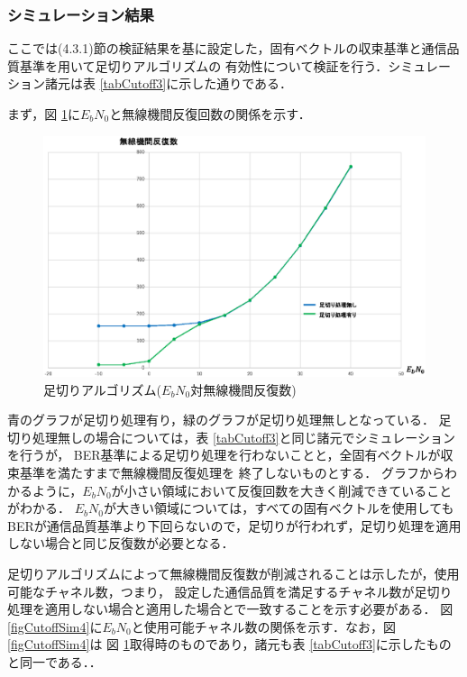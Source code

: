 \subsubsection{シミュレーション結果}
ここでは(4.3.1)節の検証結果を基に設定した，固有ベクトルの収束基準と通信品質基準を用いて足切りアルゴリズムの
有効性について検証を行う．シミュレーション諸元は表 \ref{tabCutoff3}に示した通りである．

まず，図 \ref{figCutoffSim3}に$E_bN_0$と無線機間反復回数の関係を示す．

\begin{figure}[h]
    \centering
    \includegraphics[width=0.95\linewidth]{chapter4/figure/CutoffSim3.eps}
    \caption{足切りアルゴリズム($E_bN_0$対無線機間反復数)}
    \label{figCutoffSim3}
\end{figure}

青のグラフが足切り処理有り，緑のグラフが足切り処理無しとなっている．
足切り処理無しの場合については，表 \ref{tabCutoff3}と同じ諸元でシミュレーションを行うが，
BER基準による足切り処理を行わないことと，全固有ベクトルが収束基準を満たすまで無線機間反復処理を
終了しないものとする．
グラフからわかるように，$E_bN_0$が小さい領域において反復回数を大きく削減できていることがわかる．
$E_bN_0$が大きい領域については，すべての固有ベクトルを使用しても
BERが通信品質基準より下回らないので，足切りが行われず，足切り処理を適用しない場合と同じ反復数が必要となる．

足切りアルゴリズムによって無線機間反復数が削減されることは示したが，使用可能なチャネル数，つまり，
設定した通信品質を満足するチャネル数が足切り処理を適用しない場合と適用した場合とで一致することを示す必要がある．
図 \ref{figCutoffSim4}に$E_bN_0$と使用可能チャネル数の関係を示す．なお，図 \ref{figCutoffSim4}は
図 \ref{figCutoffSim3}取得時のものであり，諸元も表 \ref{tabCutoff3}に示したものと同一である．．

